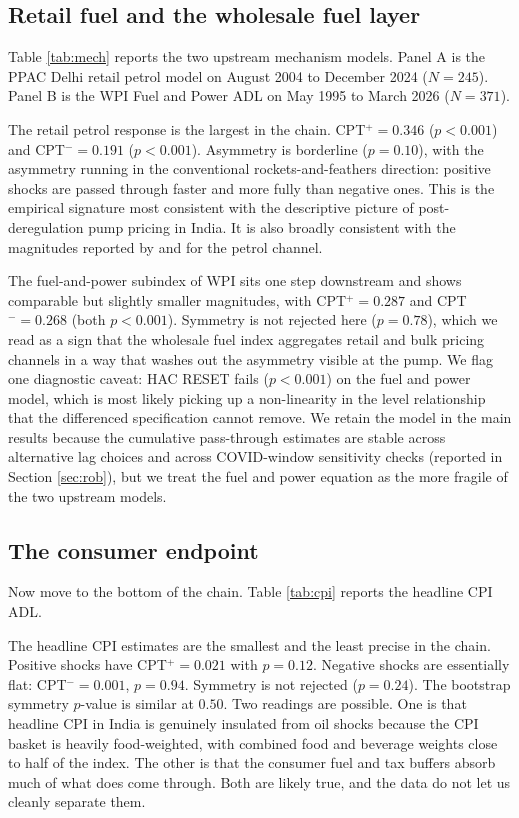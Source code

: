 \documentclass[11pt,a4paper]{article}
\begin{document}
\subsection{Retail fuel and the wholesale fuel layer}

Table \ref{tab:mech} reports the two upstream mechanism models. Panel A is the PPAC Delhi retail petrol model on August 2004 to December 2024 ($N=245$). Panel B is the WPI Fuel and Power ADL on May 1995 to March 2026 ($N=371$).



The retail petrol response is the largest in the chain. CPT$^+ = 0.346$ ($p < 0.001$) and CPT$^- = 0.191$ ($p < 0.001$). Asymmetry is borderline ($p = 0.10$), with the asymmetry running in the conventional rockets-and-feathers direction: positive shocks are passed through faster and more fully than negative ones. This is the empirical signature most consistent with the descriptive picture of post-deregulation pump pricing in India. It is also broadly consistent with the magnitudes reported by \citet{deheri2024} and \citet{pradeep2022} for the petrol channel.

The fuel-and-power subindex of WPI sits one step downstream and shows comparable but slightly smaller magnitudes, with CPT$^+ = 0.287$ and CPT$^- = 0.268$ (both $p < 0.001$). Symmetry is not rejected here ($p = 0.78$), which we read as a sign that the wholesale fuel index aggregates retail and bulk pricing channels in a way that washes out the asymmetry visible at the pump. We flag one diagnostic caveat: HAC RESET fails ($p < 0.001$) on the fuel and power model, which is most likely picking up a non-linearity in the level relationship that the differenced specification cannot remove. We retain the model in the main results because the cumulative pass-through estimates are stable across alternative lag choices and across COVID-window sensitivity checks (reported in Section \ref{sec:rob}), but we treat the fuel and power equation as the more fragile of the two upstream models.

\subsection{The consumer endpoint}

Now move to the bottom of the chain. Table \ref{tab:cpi} reports the headline CPI ADL.



The headline CPI estimates are the smallest and the least precise in the chain. Positive shocks have CPT$^+ = 0.021$ with $p = 0.12$. Negative shocks are essentially flat: CPT$^- = 0.001$, $p = 0.94$. Symmetry is not rejected ($p = 0.24$). The bootstrap symmetry $p$-value is similar at $0.50$. Two readings are possible. One is that headline CPI in India is genuinely insulated from oil shocks because the CPI basket is heavily food-weighted, with combined food and beverage weights close to half of the index. The other is that the consumer fuel and tax buffers absorb much of what does come through. Both are likely true, and the data do not let us cleanly separate them.
\end{document}
